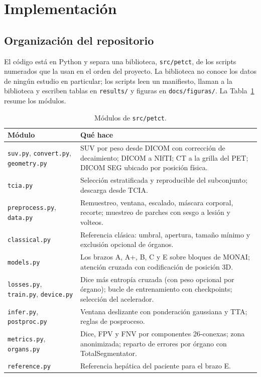 \section{Implementación}

\subsection{Organización del repositorio}

El código está en Python y separa una biblioteca, \texttt{src/petct}, de los scripts numerados que la usan en el orden del proyecto. La biblioteca no conoce los datos de ningún estudio en particular; los scripts leen un manifiesto, llaman a la biblioteca y escriben tablas en \texttt{results/} y figuras en \texttt{docs/figuras/}. La Tabla~\ref{tab:modulos} resume los módulos.

\begin{table}[h]
\centering\small
\caption{Módulos de \texttt{src/petct}.}
\label{tab:modulos}
\begin{tabularx}{\linewidth}{@{}lX@{}}
\toprule
Módulo & Qué hace \\
\midrule
\texttt{suv.py}, \texttt{convert.py}, \texttt{geometry.py} & SUV por peso desde DICOM con corrección de decaimiento; DICOM a NIfTI; CT a la grilla del PET; DICOM SEG ubicado por posición física. \\
\texttt{tcia.py} & Selección estratificada y reproducible del subconjunto; descarga desde TCIA. \\
\texttt{preprocess.py}, \texttt{data.py} & Remuestreo, ventana, escalado, máscara corporal, recorte; muestreo de parches con sesgo a lesión y volteos. \\
\texttt{classical.py} & Referencia clásica: umbral, apertura, tamaño mínimo y exclusión opcional de órganos. \\
\texttt{models.py} & Los brazos A, A+, B, C y E sobre bloques de MONAI; atención cruzada con codificación de posición 3D. \\
\texttt{losses.py}, \texttt{train.py}, \texttt{device.py} & Dice más entropía cruzada (con peso opcional por órgano); bucle de entrenamiento con checkpoints; selección del acelerador. \\
\texttt{infer.py}, \texttt{postproc.py} & Ventana deslizante con ponderación gaussiana y TTA; reglas de posproceso. \\
\texttt{metrics.py}, \texttt{organs.py} & Dice, FPV y FNV por componentes 26-conexas; zona anonimizada; reparto de errores por órgano con TotalSegmentator. \\
\texttt{reference.py} & Referencia hepática del paciente para el brazo E. \\
\bottomrule
\end{tabularx}
\end{table}

